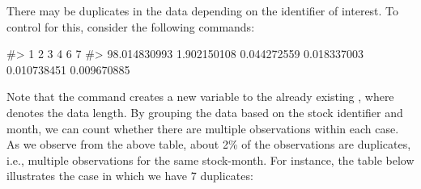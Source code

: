 There may be duplicates in the data depending on the identifier of
interest. To control for this, consider the following commands:

\begin{Schunk}
\begin{Soutput}
#>            1            2            3            4            6            7 
#> 98.014830993  1.902150108  0.044272559  0.018337003  0.010738451  0.009670885
\end{Soutput}
\end{Schunk} %
Note that the \code{:=} command creates a new variable to the already
existing , where  denotes the data length.
By grouping the data based on the stock identifier and month, we can
count whether there are multiple observations within each case. As we
observe from the above table, about 2\% of the observations are
duplicates, i.e., multiple observations for the same stock-month. For
instance, the table below illustrates the case in which we have 7
duplicates:

